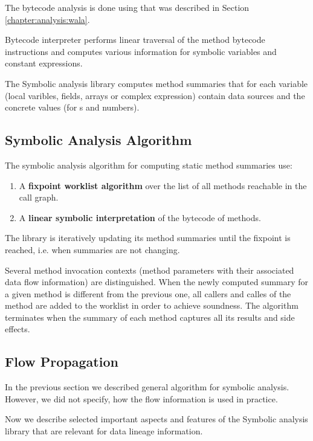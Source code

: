 The bytecode analysis is done using \citet{WalaFramework}
that was described in Section \ref{chapter:analysis:wala}.

Bytecode interpreter performs linear traversal of the method bytecode instructions
and computes various information for symbolic variables and constant expressions.

The Symbolic analysis library computes method summaries that for each
variable (local varibles, fields, arrays or complex expression) contain
data sources and the concrete values (for s and numbers).



\subsection{Symbolic Analysis Algorithm \label{chapter:analysis:algorithm}}

The symbolic analysis algorithm for computing static method summaries use:
\begin{enumerate}
  \item A \textbf{fixpoint worklist algorithm} over the list of all methods
    reachable in the call graph.
  \item A \textbf{linear symbolic interpretation} of the bytecode of methods.
\end{enumerate}

The library is iteratively updating its method summaries until the fixpoint is reached, i.e.
when summaries are not changing.

Several method invocation contexts (method parameters with their associated data flow information)
are distinguished. When the newly computed summary for a given method is different from the previous
one, all callers and calles of the method are added to the worklist in order to achieve soundness.
The algorithm terminates when the summary of each method captures all its results and side effects.




\subsection{Flow Propagation}

In the previous section we described general algorithm for symbolic analysis.
However, we did not specify, how the flow information is used in practice.

Now we describe selected important aspects and features of the Symbolic analysis library
that are relevant for data lineage information.




